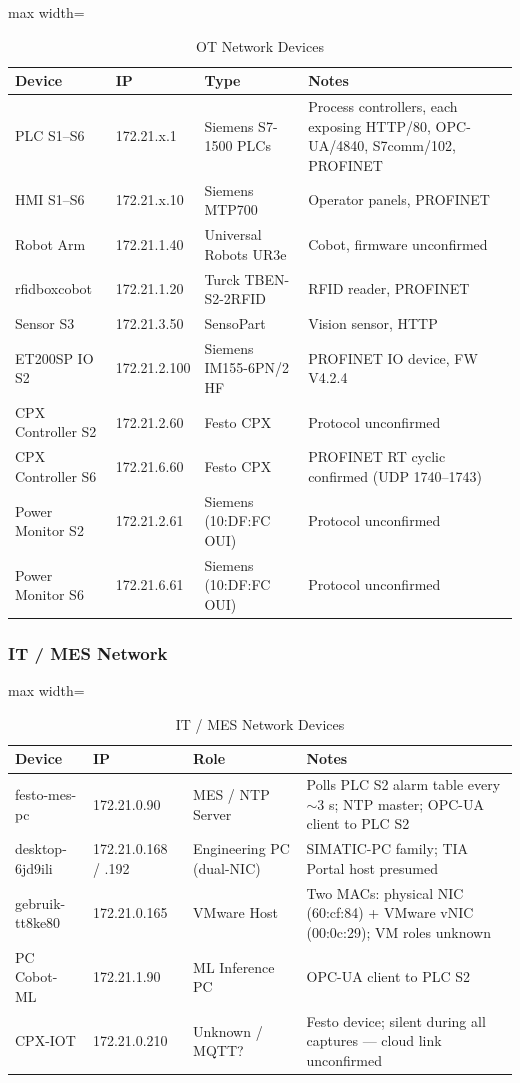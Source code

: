 \begin{table}[H]
\centering
\begin{adjustbox}{max width=\textwidth}
\begin{tabular}{@{}llll@{}}
\toprule
\textbf{Device} & \textbf{IP} & \textbf{Type} & \textbf{Notes} \\
\midrule
PLC S1–S6 & 172.21.x.1 & Siemens S7-1500 PLCs & Process controllers, each exposing HTTP/80, OPC-UA/4840, S7comm/102, PROFINET \\
HMI S1–S6 & 172.21.x.10 & Siemens MTP700 & Operator panels, PROFINET \\
Robot Arm & 172.21.1.40 & Universal Robots UR3e & Cobot, firmware unconfirmed \\
rfidboxcobot & 172.21.1.20 & Turck TBEN-S2-2RFID & RFID reader, PROFINET \\
Sensor S3 & 172.21.3.50 & SensoPart & Vision sensor, HTTP \\
ET200SP IO S2 & 172.21.2.100 & Siemens IM155-6PN/2 HF & PROFINET IO device, FW V4.2.4 \\
CPX Controller S2 & 172.21.2.60 & Festo CPX & Protocol unconfirmed \\
CPX Controller S6 & 172.21.6.60 & Festo CPX & PROFINET RT cyclic confirmed (UDP 1740–1743) \\
Power Monitor S2 & 172.21.2.61 & Siemens (10:DF:FC OUI) & Protocol unconfirmed \\
Power Monitor S6 & 172.21.6.61 & Siemens (10:DF:FC OUI) & Protocol unconfirmed \\
\bottomrule
\end{tabular}
\end{adjustbox}
\caption{OT Network Devices}
\end{table}

\subsubsection{IT / MES Network}

\begin{table}[H]
\centering
\begin{adjustbox}{max width=\textwidth}
\begin{tabular}{@{}llll@{}}
\toprule
\textbf{Device} & \textbf{IP} & \textbf{Role} & \textbf{Notes} \\
\midrule
festo-mes-pc & 172.21.0.90 & MES / NTP Server & Polls PLC S2 alarm table every $\sim$3 s; NTP master; OPC-UA client to PLC S2 \\
desktop-6jd9ili & 172.21.0.168 / .192 & Engineering PC (dual-NIC) & SIMATIC-PC family; TIA Portal host presumed \\
gebruik-tt8ke80 & 172.21.0.165 & VMware Host & Two MACs: physical NIC (60:cf:84) + VMware vNIC (00:0c:29); VM roles unknown \\
PC Cobot-ML & 172.21.1.90 & ML Inference PC & OPC-UA client to PLC S2 \\
CPX-IOT & 172.21.0.210 & Unknown / MQTT? & Festo device; silent during all captures — cloud link unconfirmed \\
\bottomrule
\end{tabular}
\end{adjustbox}
\caption{IT / MES Network Devices}
\end{table}

